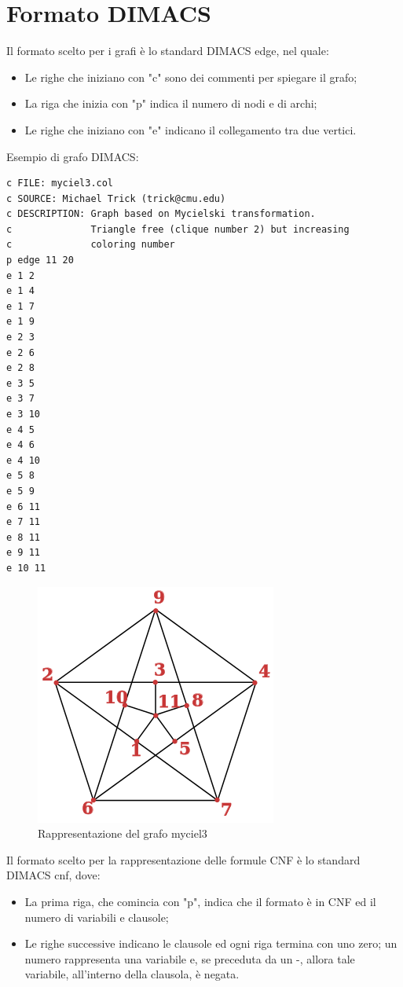 \documentclass[a4paper,11pt]{article} %
\begin{document}
\section{Formato DIMACS}
Il formato scelto per i grafi è lo standard DIMACS edge, nel quale:
\begin{itemize}
	\item Le righe che iniziano con "c" sono dei commenti per spiegare il grafo;
	\item La riga che inizia con "p" indica il numero di nodi e di archi;
	\item Le righe che iniziano con "e" indicano il collegamento tra due vertici.
\end{itemize}
Esempio di grafo DIMACS:\\
\begin{verbatim}
c FILE: myciel3.col
c SOURCE: Michael Trick (trick@cmu.edu)
c DESCRIPTION: Graph based on Mycielski transformation. 
c              Triangle free (clique number 2) but increasing
c              coloring number
p edge 11 20
e 1 2
e 1 4
e 1 7
e 1 9
e 2 3
e 2 6
e 2 8
e 3 5
e 3 7
e 3 10
e 4 5
e 4 6
e 4 10
e 5 8
e 5 9
e 6 11
e 7 11
e 8 11
e 9 11
e 10 11
\end{verbatim}
\begin{figure}
	\centering
	\includegraphics[scale=0.5]{myciel.jpg}
	\caption{Rappresentazione del grafo myciel3}
\end{figure}
Il formato scelto per la rappresentazione delle formule CNF è lo standard DIMACS cnf, dove:
\begin{itemize}
	\item La prima riga, che comincia con "p", indica che il formato è in CNF ed il numero di variabili e clausole;
	\item Le righe successive indicano le clausole ed ogni riga termina con uno zero; un numero rappresenta una variabile e, se preceduta da un -, allora tale variabile, all'interno della clausola, è negata.
\end{itemize}
\end{document}
